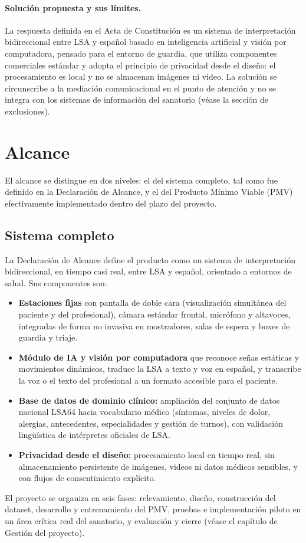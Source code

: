 \paragraph{Solución propuesta y sus límites.} La respuesta definida en el Acta de Constitución es un sistema de interpretación bidireccional entre LSA y español basado en inteligencia artificial y visión por computadora, pensado para el entorno de guardia, que utiliza componentes comerciales estándar y adopta el principio de privacidad desde el diseño: el procesamiento es local y no se almacenan imágenes ni video. La solución se circunscribe a la mediación comunicacional en el punto de atención y no se integra con los sistemas de información del sanatorio (véase la sección de exclusiones).

\section{Alcance}

El alcance se distingue en dos niveles: el del sistema completo, tal como fue definido en la Declaración de Alcance, y el del Producto Mínimo Viable (PMV) efectivamente implementado dentro del plazo del proyecto.

\subsection{Sistema completo}

La Declaración de Alcance define el producto como un sistema de interpretación bidireccional, en tiempo casi real, entre LSA y español, orientado a entornos de salud. Sus componentes son:
\begin{itemize}
  \item \textbf{Estaciones fijas} con pantalla de doble cara (visualización simultánea del paciente y del profesional), cámara estándar frontal, micrófono y altavoces, integradas de forma no invasiva en mostradores, salas de espera y boxes de guardia y triaje.
  \item \textbf{Módulo de IA y visión por computadora} que reconoce señas estáticas y movimientos dinámicos, traduce la LSA a texto y voz en español, y transcribe la voz o el texto del profesional a un formato accesible para el paciente.
  \item \textbf{Base de datos de dominio clínico:} ampliación del conjunto de datos nacional LSA64 hacia vocabulario médico (síntomas, niveles de dolor, alergias, antecedentes, especialidades y gestión de turnos), con validación lingüística de intérpretes oficiales de LSA.
  \item \textbf{Privacidad desde el diseño:} procesamiento local en tiempo real, sin almacenamiento persistente de imágenes, videos ni datos médicos sensibles, y con flujos de consentimiento explícito.
\end{itemize}
El proyecto se organiza en seis fases: relevamiento, diseño, construcción del dataset, desarrollo y entrenamiento del PMV, pruebas e implementación piloto en un área crítica real del sanatorio, y evaluación y cierre (véase el capítulo de Gestión del proyecto).

